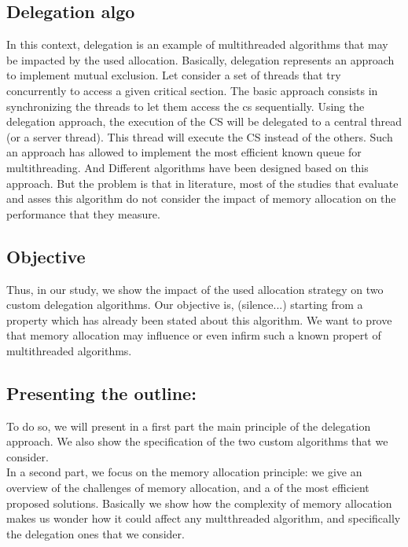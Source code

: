 \documentclass[10pt]{article}											%
\begin{document}
\subsection{Delegation algo}
		In this context, delegation is an example of multithreaded algorithms that may be impacted by the used allocation.
		Basically, delegation represents an approach to implement mutual exclusion.   Let consider a set of threads that try concurrently to access a given critical section.   
        The basic approach consists in synchronizing the threads to let them access the cs sequentially.   Using the delegation approach, the execution of the CS will be delegated to a central thread (or a server thread).   This thread will execute the CS instead of the others.
        Such an approach has allowed to implement the most efficient known queue for multithreading.   And Different algorithms have been designed based on this approach.  But the problem is that in literature, most of the studies that evaluate and asses this algorithm do not consider the impact of memory allocation on the performance that they measure.



\subsection{Objective}
		Thus, in our study, we show the impact of the used allocation strategy on two custom delegation algorithms.
		Our objective is, (silence...) starting from a property which has already been stated about this algorithm. We want to prove that memory allocation may influence or even infirm such a known propert of multithreaded algorithms.



\subsection{Presenting the outline:}
		To do so, we will present in a first part the main principle of the delegation approach. We also show the specification of the two custom algorithms that we consider.\\
      
		In a second part, we focus on the memory allocation principle:  we give an overview of the challenges of memory allocation, and a of the most efficient proposed solutions.
		Basically we show how the complexity of memory allocation makes us wonder how it could affect any multthreaded algorithm, and specifically the delegation ones that we consider.
\end{document}
